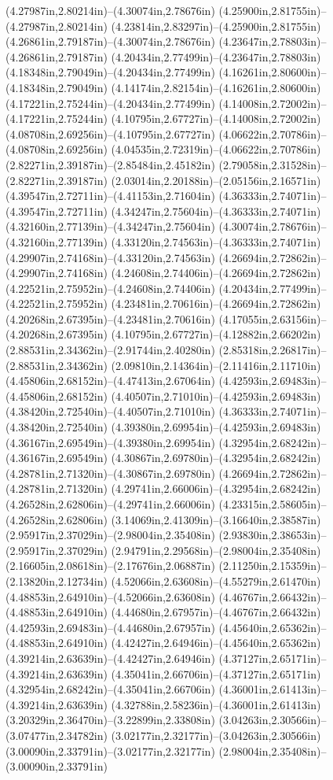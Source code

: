 (4.27987in,2.80214in)--(4.30074in,2.78676in) (4.25900in,2.81755in)--(4.27987in,2.80214in) (4.23814in,2.83297in)--(4.25900in,2.81755in) (4.26861in,2.79187in)--(4.30074in,2.78676in) (4.23647in,2.78803in)--(4.26861in,2.79187in) (4.20434in,2.77499in)--(4.23647in,2.78803in) (4.18348in,2.79049in)--(4.20434in,2.77499in) (4.16261in,2.80600in)--(4.18348in,2.79049in) (4.14174in,2.82154in)--(4.16261in,2.80600in) (4.17221in,2.75244in)--(4.20434in,2.77499in) (4.14008in,2.72002in)--(4.17221in,2.75244in) (4.10795in,2.67727in)--(4.14008in,2.72002in) (4.08708in,2.69256in)--(4.10795in,2.67727in) (4.06622in,2.70786in)--(4.08708in,2.69256in) (4.04535in,2.72319in)--(4.06622in,2.70786in) (2.82271in,2.39187in)--(2.85484in,2.45182in) (2.79058in,2.31528in)--(2.82271in,2.39187in) (2.03014in,2.20188in)--(2.05156in,2.16571in) (4.39547in,2.72711in)--(4.41153in,2.71604in) (4.36333in,2.74071in)--(4.39547in,2.72711in) (4.34247in,2.75604in)--(4.36333in,2.74071in) (4.32160in,2.77139in)--(4.34247in,2.75604in) (4.30074in,2.78676in)--(4.32160in,2.77139in) (4.33120in,2.74563in)--(4.36333in,2.74071in) (4.29907in,2.74168in)--(4.33120in,2.74563in) (4.26694in,2.72862in)--(4.29907in,2.74168in) (4.24608in,2.74406in)--(4.26694in,2.72862in) (4.22521in,2.75952in)--(4.24608in,2.74406in) (4.20434in,2.77499in)--(4.22521in,2.75952in) (4.23481in,2.70616in)--(4.26694in,2.72862in) (4.20268in,2.67395in)--(4.23481in,2.70616in) (4.17055in,2.63156in)--(4.20268in,2.67395in) (4.10795in,2.67727in)--(4.12882in,2.66202in) (2.88531in,2.34362in)--(2.91744in,2.40280in) (2.85318in,2.26817in)--(2.88531in,2.34362in) (2.09810in,2.14364in)--(2.11416in,2.11710in) (4.45806in,2.68152in)--(4.47413in,2.67064in) (4.42593in,2.69483in)--(4.45806in,2.68152in) (4.40507in,2.71010in)--(4.42593in,2.69483in) (4.38420in,2.72540in)--(4.40507in,2.71010in) (4.36333in,2.74071in)--(4.38420in,2.72540in) (4.39380in,2.69954in)--(4.42593in,2.69483in) (4.36167in,2.69549in)--(4.39380in,2.69954in) (4.32954in,2.68242in)--(4.36167in,2.69549in) (4.30867in,2.69780in)--(4.32954in,2.68242in) (4.28781in,2.71320in)--(4.30867in,2.69780in) (4.26694in,2.72862in)--(4.28781in,2.71320in) (4.29741in,2.66006in)--(4.32954in,2.68242in) (4.26528in,2.62806in)--(4.29741in,2.66006in) (4.23315in,2.58605in)--(4.26528in,2.62806in) (3.14069in,2.41309in)--(3.16640in,2.38587in) (2.95917in,2.37029in)--(2.98004in,2.35408in) (2.93830in,2.38653in)--(2.95917in,2.37029in) (2.94791in,2.29568in)--(2.98004in,2.35408in) (2.16605in,2.08618in)--(2.17676in,2.06887in) (2.11250in,2.15359in)--(2.13820in,2.12734in) (4.52066in,2.63608in)--(4.55279in,2.61470in) (4.48853in,2.64910in)--(4.52066in,2.63608in) (4.46767in,2.66432in)--(4.48853in,2.64910in) (4.44680in,2.67957in)--(4.46767in,2.66432in) (4.42593in,2.69483in)--(4.44680in,2.67957in) (4.45640in,2.65362in)--(4.48853in,2.64910in) (4.42427in,2.64946in)--(4.45640in,2.65362in) (4.39214in,2.63639in)--(4.42427in,2.64946in) (4.37127in,2.65171in)--(4.39214in,2.63639in) (4.35041in,2.66706in)--(4.37127in,2.65171in) (4.32954in,2.68242in)--(4.35041in,2.66706in) (4.36001in,2.61413in)--(4.39214in,2.63639in) (4.32788in,2.58236in)--(4.36001in,2.61413in) (3.20329in,2.36470in)--(3.22899in,2.33808in) (3.04263in,2.30566in)--(3.07477in,2.34782in) (3.02177in,2.32177in)--(3.04263in,2.30566in) (3.00090in,2.33791in)--(3.02177in,2.32177in) (2.98004in,2.35408in)--(3.00090in,2.33791in) 